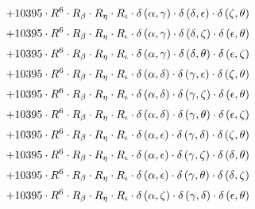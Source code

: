 \begin{subequations}
\begin{gather}
 \\[0.2em] \notag 		 + 10395 \cdot R^{6} \cdot R_{\beta{}} \cdot R_{\eta{}} \cdot R_{\iota{}} \cdot \delta{}\left(\alpha{}, \gamma{}\right) \cdot \delta{}\left(\delta{}, \epsilon{}\right) \cdot \delta{}\left(\zeta{}, \theta{}\right) 
 \\[0.2em] \notag 		 + 10395 \cdot R^{6} \cdot R_{\beta{}} \cdot R_{\eta{}} \cdot R_{\iota{}} \cdot \delta{}\left(\alpha{}, \gamma{}\right) \cdot \delta{}\left(\delta{}, \zeta{}\right) \cdot \delta{}\left(\epsilon{}, \theta{}\right) 
 \\[0.2em] \notag 		 + 10395 \cdot R^{6} \cdot R_{\beta{}} \cdot R_{\eta{}} \cdot R_{\iota{}} \cdot \delta{}\left(\alpha{}, \gamma{}\right) \cdot \delta{}\left(\delta{}, \theta{}\right) \cdot \delta{}\left(\epsilon{}, \zeta{}\right) 
 \\[0.2em] \notag 		 + 10395 \cdot R^{6} \cdot R_{\beta{}} \cdot R_{\eta{}} \cdot R_{\iota{}} \cdot \delta{}\left(\alpha{}, \delta{}\right) \cdot \delta{}\left(\gamma{}, \epsilon{}\right) \cdot \delta{}\left(\zeta{}, \theta{}\right) 
 \\[0.2em] \notag 		 + 10395 \cdot R^{6} \cdot R_{\beta{}} \cdot R_{\eta{}} \cdot R_{\iota{}} \cdot \delta{}\left(\alpha{}, \delta{}\right) \cdot \delta{}\left(\gamma{}, \zeta{}\right) \cdot \delta{}\left(\epsilon{}, \theta{}\right) 
 \\[0.2em] \notag 		 + 10395 \cdot R^{6} \cdot R_{\beta{}} \cdot R_{\eta{}} \cdot R_{\iota{}} \cdot \delta{}\left(\alpha{}, \delta{}\right) \cdot \delta{}\left(\gamma{}, \theta{}\right) \cdot \delta{}\left(\epsilon{}, \zeta{}\right) 
 \\[0.2em] \notag 		 + 10395 \cdot R^{6} \cdot R_{\beta{}} \cdot R_{\eta{}} \cdot R_{\iota{}} \cdot \delta{}\left(\alpha{}, \epsilon{}\right) \cdot \delta{}\left(\gamma{}, \delta{}\right) \cdot \delta{}\left(\zeta{}, \theta{}\right) 
 \\[0.2em] \notag 		 + 10395 \cdot R^{6} \cdot R_{\beta{}} \cdot R_{\eta{}} \cdot R_{\iota{}} \cdot \delta{}\left(\alpha{}, \epsilon{}\right) \cdot \delta{}\left(\gamma{}, \zeta{}\right) \cdot \delta{}\left(\delta{}, \theta{}\right) 
 \\[0.2em] \notag 		 + 10395 \cdot R^{6} \cdot R_{\beta{}} \cdot R_{\eta{}} \cdot R_{\iota{}} \cdot \delta{}\left(\alpha{}, \epsilon{}\right) \cdot \delta{}\left(\gamma{}, \theta{}\right) \cdot \delta{}\left(\delta{}, \zeta{}\right) 
 \\[0.2em] \notag 		 + 10395 \cdot R^{6} \cdot R_{\beta{}} \cdot R_{\eta{}} \cdot R_{\iota{}} \cdot \delta{}\left(\alpha{}, \zeta{}\right) \cdot \delta{}\left(\gamma{}, \delta{}\right) \cdot \delta{}\left(\epsilon{}, \theta{}\right) 

\end{gather}
\end{subequations}
